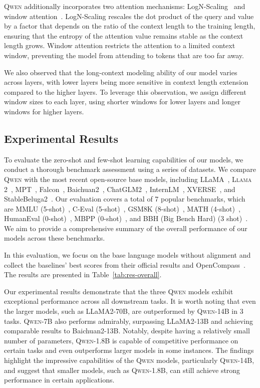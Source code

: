\textsc{Qwen} additionally incorporates two attention mechanisms: LogN-Scaling~\citep{logn_attn,logn_su} and window attention~\citep{window_attn}. LogN-Scaling rescales the dot product of the query and value by a factor that depends on the ratio of the context length to the training length, ensuring that the entropy of the attention value remains stable as the context length grows. Window attention restricts the attention to a limited context window, preventing the model from attending to tokens that are too far away.

We also observed that the long-context modeling ability of our model varies across layers, with lower layers being more sensitive in context length extension compared to the higher layers. To leverage this observation, we assign different window sizes to each layer, using shorter windows for lower layers and longer windows for higher layers.

\subsection{Experimental Results} To evaluate the zero-shot and few-shot learning capabilities of our models, we conduct a thorough benchmark assessment using a series of datasets. We compare \textsc{Qwen} with the most recent open-source base models, including LLaMA~\citep{llama}, \textsc{Llama 2}~\citep{llama2}, MPT~\citep{mpt}, Falcon~\citep{falcon}, Baichuan2~\citep{baichuan2}, ChatGLM2~\citep{chatglm2}, InternLM~\citep{internlm}, XVERSE~\citep{xverse}, and StableBeluga2~\citep{StableBeluga2}. Our evaluation covers a total of 7 popular benchmarks, which are MMLU (5-shot)~\citep{mmlu}, C-Eval (5-shot)~\citep{ceval}, GSM8K (8-shot)~\citep{gsm8k}, MATH (4-shot)~\citep{hendrycks2021measuring}, HumanEval (0-shot)~\citep{codex}, MBPP (0-shot)~\citep{mbpp}, and BBH (Big Bench Hard) (3 shot)~\citep{bbh}. We aim to provide a comprehensive summary of the overall performance of our models across these benchmarks.

In this evaluation, we focus on the base language models without alignment and collect the baselines' best scores from their official results and OpenCompass~\citep{opencompass}. The results are presented in Table~\ref{tab:res-overall}.

Our experimental results demonstrate that the three \textsc{Qwen} models exhibit exceptional performance across all downstream tasks. It is worth noting that even the larger models, such as LLaMA2-70B, are outperformed by \textsc{Qwen}\textsc{-14B} in \num{3} tasks. 
\textsc{Qwen}\textsc{-7B} also performs admirably, surpassing LLaMA2-13B and achieving comparable results to Baichuan2-13B. Notably, despite having a relatively small number of parameters, \textsc{Qwen}\textsc{-1.8B} is capable of competitive performance on certain tasks and even outperforms larger models in some instances. The findings highlight the impressive capabilities of the \textsc{Qwen} models, particularly \textsc{Qwen}\textsc{-14B}, and suggest that smaller models, such as \textsc{Qwen}\textsc{-1.8B}, can still achieve strong performance in certain applications.

